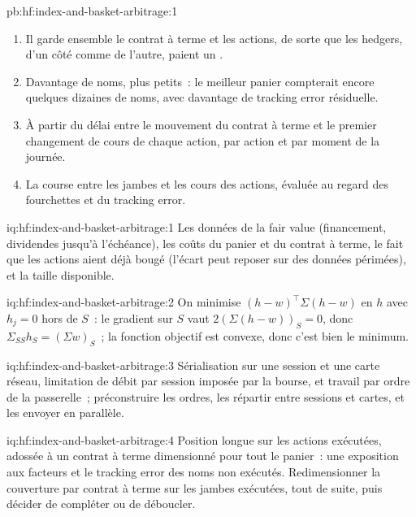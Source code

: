 \begin{solution}{pb:hf:index-and-basket-arbitrage:1}
\begin{enumerate}
\item Il garde ensemble le contrat à terme et les actions, de sorte que les hedgers, d'un côté comme de l'autre, paient un .
\item Davantage de noms, plus petits~: le meilleur panier compterait encore quelques dizaines de noms, avec davantage de tracking error résiduelle.
\item À partir du délai entre le mouvement du contrat à terme et le premier changement de cours de chaque action, par action et par moment de la journée.
\item La course entre les jambes et les cours des actions, évaluée au regard des fourchettes et du tracking error.
\end{enumerate}
\end{solution}

\begin{solution}{iq:hf:index-and-basket-arbitrage:1}
Les données de la fair value (financement, dividendes jusqu'à l'échéance), les coûts du panier et du contrat à terme, le fait que les actions aient déjà bougé (l'écart peut
reposer sur des données périmées), et la taille disponible.
\end{solution}

\begin{solution}{iq:hf:index-and-basket-arbitrage:2}
On minimise $(h-w)^\top\Sigma(h-w)$ en $h$ avec $h_j=0$ hors de $S$~: le gradient sur $S$ vaut $2(\Sigma(h-w))_S=0$, donc $\Sigma_{SS}h_S=(\Sigma w)_S$~; la
fonction objectif est convexe, donc c'est bien le minimum.
\end{solution}

\begin{solution}{iq:hf:index-and-basket-arbitrage:3}
Sérialisation sur une session et une carte réseau, limitation de débit par session imposée par la bourse, et travail par ordre de la passerelle~; préconstruire les ordres,
les répartir entre sessions et cartes, et les envoyer en parallèle.
\end{solution}

\begin{solution}{iq:hf:index-and-basket-arbitrage:4}
Position longue sur les actions exécutées, adossée à un contrat à terme dimensionné pour tout le panier~: une exposition aux facteurs et le tracking error des noms non exécutés. Redimensionner la
couverture par contrat à terme sur les jambes exécutées, tout de suite, puis décider de compléter ou de déboucler.
\end{solution}


